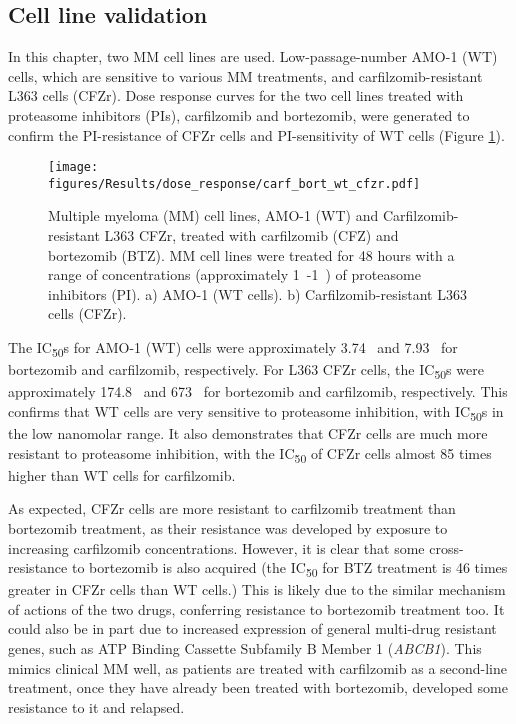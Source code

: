 \subsection{Cell line validation}
In this chapter, two MM cell lines are used.
Low-passage-number AMO-1 (WT) cells, which are sensitive to various MM treatments, and carfilzomib-resistant L363 cells (CFZr).
Dose response curves for the two cell lines treated with proteasome inhibitors (PIs), carfilzomib and bortezomib, were generated to confirm the PI-resistance of CFZr cells and PI-sensitivity of WT cells (Figure \ref{fig:dose_carf_bort}).
\begin{figure}[h]
\centering
\texttt{[image: figures/Results/dose\_response/carf\_bort\_wt\_cfzr.pdf]}
\caption[Carfilzomib and bortezomib dose response curves]{Multiple myeloma (MM) cell lines, AMO-1 (WT) and Carfilzomib-resistant L363 CFZr, treated with carfilzomib (CFZ) and bortezomib (BTZ).
MM cell lines were treated for 48 hours with a range of concentrations (approximately 1\si{\nano\Molar}-1\si{\micro\Molar}) of proteasome inhibitors (PI).
a) AMO-1 (WT cells).
b) Carfilzomib-resistant L363 cells (CFZr).}
\label{fig:dose_carf_bort}
\end{figure}
The IC\textsubscript{50}s for AMO-1 (WT) cells were approximately 3.74\si{\nano\Molar} and 7.93\si{\nano\Molar} for bortezomib and carfilzomib, respectively.
For L363 CFZr cells, the IC\textsubscript{50}s were approximately 174.8\si{\nano\Molar} and 673\si{\nano\Molar} for bortezomib and carfilzomib, respectively.
This confirms that WT cells are very sensitive to proteasome inhibition, with IC\textsubscript{50}s in the low nanomolar range.
It also demonstrates that CFZr cells are much more resistant to proteasome inhibition, with the IC\textsubscript{50} of CFZr cells almost 85 times higher than WT cells for carfilzomib.

As expected, CFZr cells are more resistant to carfilzomib treatment than bortezomib treatment, as their resistance was developed by exposure to increasing carfilzomib concentrations.
However, it is clear that some cross-resistance to bortezomib is also acquired (the IC\textsubscript{50} for BTZ treatment is 46 times greater in CFZr cells than WT cells.)
This is likely due to the similar mechanism of actions of the two drugs, conferring resistance to bortezomib treatment too.
It could also be in part due to increased expression of general multi-drug resistant genes, such as ATP Binding Cassette Subfamily B Member 1 (\textit{ABCB1}).
This mimics clinical MM well, as patients are treated with carfilzomib as a second-line treatment, once they have already been treated with bortezomib, developed some resistance to it and relapsed.

